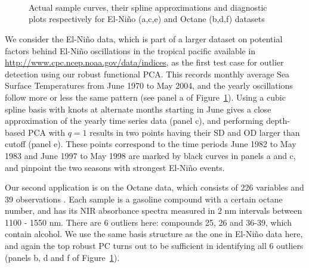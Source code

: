 \begin{figure}
\begin{center}
\\

\\

\\
\caption{Actual sample curves, their spline approximations and diagnostic plots respectively for El-Ni\~no (a,c,e) and Octane (b,d,f) datasets}
\label{fig:fPCAfig}
\end{center}
\end{figure}

We consider the El-Ni\~no data, which is part of a larger dataset on potential factors behind El-Ni\~no oscillations in the tropical pacific available in \url{http://www.cpc.ncep.noaa.gov/data/indices}, as the first test case for outlier detection using our robust functional PCA. This records monthly average Sea Surface Temperatures from June 1970 to May 2004, and the yearly oscillations follow more or less the same pattern (see panel a of Figure~\ref{fig:fPCAfig}). Using a cubic spline basis with knots at alternate months starting in June gives a close approximation of the yearly time series data (panel c), and performing depth-based PCA with $q=1$ results in two points having their SD and OD larger than cutoff (panel e). These points correspond to the time periods June 1982 to May 1983 and June 1997 to May 1998 are marked by black curves in panels a and c, and pinpoint the two seasons with strongest El-Ni\~no events.

Our second application is on the Octane data, which consists of 226 variables and 39 observations \citep{esbensen94}. Each sample is a gasoline compound with a certain octane number, and has its NIR absorbance spectra measured in 2 nm intervals between 1100 - 1550 nm. There are 6 outliers here: compounds 25, 26 and 36-39, which contain alcohol. We use the same basis structure as the one in El-Ni\~no data here, and again the top robust PC turns out to be sufficient in identifying all 6 outliers (panels b, d and f of Figure~\ref{fig:fPCAfig}).